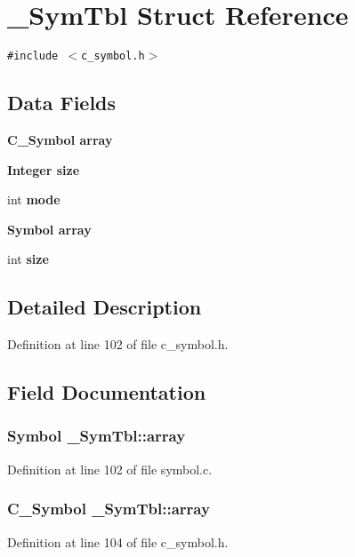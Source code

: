 \section{\_\-Sym\-Tbl Struct Reference}
\label{struct__SymTbl}
{\tt \#include $<$c\_\-symbol.h$>$}

\subsection*{Data Fields}
\begin{CompactItemize}
\item 
\bf{C\_\-Symbol} \bf{array}
\item 
\bf{Integer} \bf{size}
\item 
int \bf{mode}
\item 
\bf{Symbol} \bf{array}
\item 
int \bf{size}
\end{CompactItemize}


\subsection{Detailed Description}




Definition at line 102 of file c\_\-symbol.h.

\subsection{Field Documentation}
\subsubsection{\setlength{\rightskip}{0pt plus 5cm}\bf{Symbol} \bf{\_\-Sym\-Tbl::array}}\label{struct__SymTbl_e87b4268743755168d53c38e6cc45868}




Definition at line 102 of file symbol.c.
\subsubsection{\setlength{\rightskip}{0pt plus 5cm}\bf{C\_\-Symbol} \bf{\_\-Sym\-Tbl::array}}\label{struct__SymTbl_adcef51f8d96c761cd0cb25e97132fb6}




Definition at line 104 of file c\_\-symbol.h.

